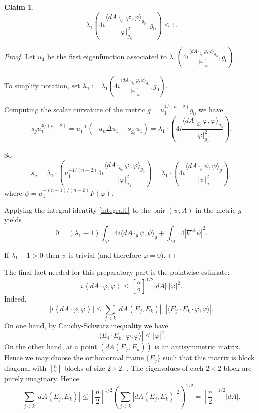 \documentclass[11pt]{amsart}
\theoremstyle{plain}
\numberwithin{equation}{section}
\theoremstyle{plain}
\newtheorem{claim}{Claim}
\begin{document}
\begin{claim}
$$\lambda_1\left(4i\frac{\langle dA\cdot_{g_0}\varphi,\varphi\rangle_{g_0}}{|\varphi|_{g_0}^2},g_0\right)\leq 1.$$
\end{claim} 
\begin{proof}
Let $u_1$ be the first eigenfunction associated to $\lambda_1\left(4i\frac{\langle dA\cdot_{g_0}\varphi,\varphi\rangle_{g_0}}{|\varphi|_{g_0}^2},g_0\right)$. 

To simplify notation, set $\lambda_1:=\lambda_1\left(4i\frac{\langle dA\cdot_{g_0}\varphi,\varphi\rangle_{g_0}}{|\varphi|_{g_0}^2},g_0\right)$.

Computing the scalar curvature of the metric $g=u_1^{4/(n-2)}g_0$ we have
$$s_{g}u_1^{4/(n-2)}=u_1^{-1}(-a_n\Delta u_1+s_{g_0}u_1)=\lambda_1\cdot \left(4i\frac{\langle dA\cdot_{g_0}\varphi,\varphi\rangle_{g_0}}{|\varphi|_{g_0}^2}\right).$$

So $$s_{g}=\lambda_1\cdot \left(u_1^{-4/(n-2)}4i\frac{\langle dA\cdot_{g_0}\varphi,\varphi\rangle_{g_0}}{|\varphi|_{g_0}^2}\right)=\lambda_1\cdot \left(4i\frac{\langle dA\cdot_{g}\psi,\psi\rangle_{g}}{|\psi|_{g}^2}\right),$$
where $\psi=u_1^{-(n-1)/(n-2)}F(\varphi)$.

Applying the integral identity \eqref{integral1} to the pair $(\psi,A)$ in the metric $g$ yields
\begin{equation}\label{integral2}
0=(\lambda_1-1)\int_M 4i\langle dA\cdot_g\psi,\psi\rangle_g +\int_M4|\nabla^{A}\psi|^2.
\end{equation}



If $\lambda_1-1>0$ then $\psi$ is trivial (and therefore $\varphi=0$).
\end{proof} 

The final fact needed for this preparatory part is the pointwise estimate: $$i\left\langle dA\cdot\varphi,\varphi\right\rangle\leq \left[\frac{n}{2}\right]^{1/2}|dA|\;|\varphi|^2.$$ 
Indeed, $$|i\left\langle dA\cdot\varphi,\varphi\right\rangle|\leq
\sum_{j<k}|dA(E_j,E_k)|\;\;|\langle E_j\cdot E_k\cdot\varphi,\varphi\rangle|. $$
On one hand, by Cauchy-Schwarz inequality we have $$|\langle E_j\cdot E_k\cdot\varphi,\varphi\rangle|\leq |\varphi|^2.$$
On the other hand, at a point $\left(dA(E_j,E_k)\right)$ is an antisymmetric matrix.  Hence we may choose the orthonormal frame $\{E_j\}$ such that this matrix is block diagonal with $\left[\frac{n}{2}\right]$ blocks of size $2\times 2$.
. The eigenvalues of each $2\times2$ block are purely imaginary. Hence $$\sum_{j<k}|dA(E_j,E_k)|\leq \left[\frac{n}{2}\right]^{1/2}\left(\sum_{j<k}|dA(E_j,E_k)|^2\right)^{1/2}=\left[\frac{n}{2}\right]^{1/2}|dA|.$$
 
\end{document}
